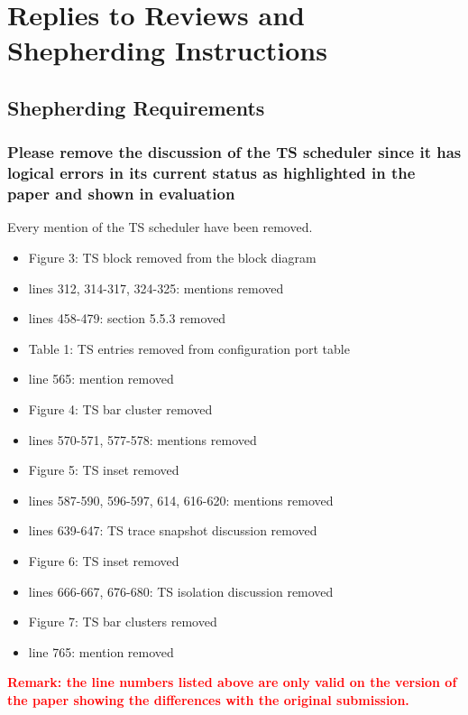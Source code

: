 \newpage
\section{Replies to Reviews and Shepherding Instructions}

    \subsection{Shepherding Requirements}

        \subsubsection{Please remove the discussion of the TS
        scheduler since it has logical errors in its current status as
        highlighted in the paper and shown in evaluation}

         \label{subsubsec:ts_removal}
            Every mention of the TS scheduler have been removed.
            \begin{itemize}
                \item Figure 3: TS block removed from the block diagram
                \item lines 312, 314-317, 324-325: mentions removed
                \item lines 458-479: section 5.5.3 removed
                \item Table 1: TS entries removed from configuration port table
                \item line 565: mention removed
                \item Figure 4: TS bar cluster removed
                \item lines 570-571, 577-578: mentions removed
                \item Figure 5: TS inset removed
                \item lines 587-590, 596-597, 614, 616-620: mentions removed
                \item lines 639-647: TS trace snapshot discussion removed
                \item Figure 6: TS inset removed
                \item lines 666-667, 676-680: TS isolation discussion removed
                \item Figure 7: TS bar clusters removed
                \item line 765: mention removed
            \end{itemize}
            \textcolor{red}{\textbf{Remark: the line numbers listed above are only valid on the version of the paper showing the differences with the original submission.}}

